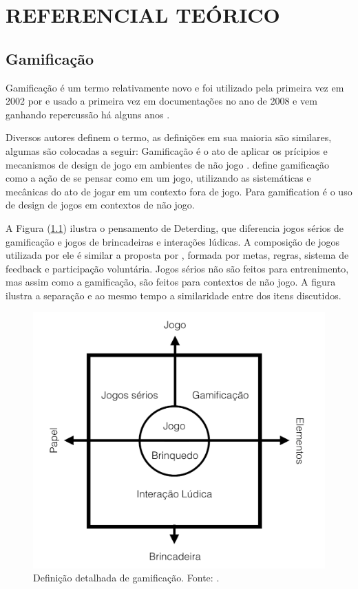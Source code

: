 \chapter[Referencial Teórico]{REFERENCIAL TEÓRICO}

\section{Gamificação}

Gamificação é um termo relativamente novo e foi utilizado pela primeira vez em 2002 por \cite{pelling} e usado a primeira vez em documentações no ano de 2008 e vem ganhando repercussão há alguns anos \cite{deterding2011gamification}.

Diversos autores definem o termo, as definições em sua maioria são similares, algumas são colocadas a seguir: Gamificação é o ato de aplicar os prícipios e mecanismos de design de jogo em ambientes de não jogo \cite{kumar2013gamification}.
\cite{da2014gamificaccao} define gamificação como a ação de se pensar como em um jogo, utilizando as sistemáticas e mecânicas do ato de jogar em um contexto fora de jogo. Para \cite{deterding2011gamification} gamification é o uso de design de jogos em contextos de não jogo. 

A Figura (\ref{deterdingfig}) ilustra o pensamento de Deterding, que diferencia jogos sérios de gamificação e jogos de brincadeiras e interações lúdicas. A composição de jogos utilizada por ele é similar a proposta por \cite{mcgonigal2011reality}, formada por metas, regras, sistema de feedback e participação voluntária. Jogos sérios não são feitos para entrenimento, mas assim como a gamificação, são feitos para contextos de não jogo. A figura ilustra a separação e ao mesmo tempo a similaridade entre dos itens discutidos. 


\begin{figure}[h]
	\centering
		\includegraphics[keepaspectratio=true,scale=0.3]{figuras/deterding.png}
	\caption{Definição detalhada de gamificação. Fonte: \cite{deterding2011gamification}.\label{deterdingfig}
}
\end{figure}

